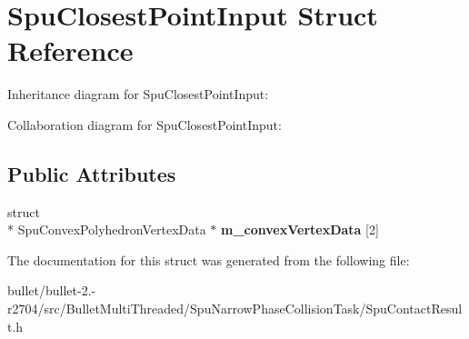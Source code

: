 \hypertarget{struct_spu_closest_point_input}{\section{Spu\+Closest\+Point\+Input Struct Reference}
\label{struct_spu_closest_point_input}
}


Inheritance diagram for Spu\+Closest\+Point\+Input\+:


Collaboration diagram for Spu\+Closest\+Point\+Input\+:
\subsection*{Public Attributes}
\begin{DoxyCompactItemize}
\item 
\hypertarget{struct_spu_closest_point_input_a2e02a670749a2e274e20dda72603b117}{struct \\*
Spu\+Convex\+Polyhedron\+Vertex\+Data $\ast$ {\bfseries m\+\_\+convex\+Vertex\+Data} \mbox{[}2\mbox{]}}\label{struct_spu_closest_point_input_a2e02a670749a2e274e20dda72603b117}

\end{DoxyCompactItemize}


The documentation for this struct was generated from the following file\+:\begin{DoxyCompactItemize}
\item 
bullet/bullet-\/2.-\/r2704/src/\+Bullet\+Multi\+Threaded/\+Spu\+Narrow\+Phase\+Collision\+Task/Spu\+Contact\+Result.\+h\end{DoxyCompactItemize}
